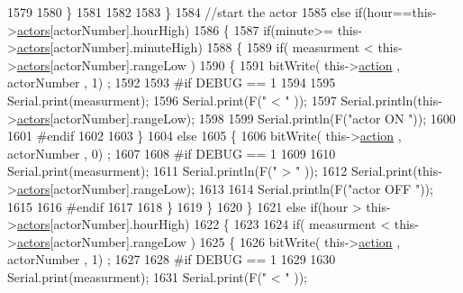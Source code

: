\begin{DoxyCode}
1579             
1580         \}
1581 
1582 
1583     \}
1584     \textcolor{comment}{//start the actor}
1585     \textcolor{keywordflow}{else} \textcolor{keywordflow}{if}(hour==this->\hyperlink{class_jetpack_a7e16d2f97837f9712a2e6de1c50d99db}{actors}[actorNumber].hourHigh)
1586     \{
1587         \textcolor{keywordflow}{if}(minute>= this->\hyperlink{class_jetpack_a7e16d2f97837f9712a2e6de1c50d99db}{actors}[actorNumber].minuteHigh)
1588         \{
1589             \textcolor{keywordflow}{if}( measurment < this->\hyperlink{class_jetpack_a7e16d2f97837f9712a2e6de1c50d99db}{actors}[actorNumber].rangeLow )
1590             \{
1591                 bitWrite( this->\hyperlink{class_jetpack_aca3142925a7b0834b34ae91d26af7765}{action} , actorNumber , 1) ;
1592 
1593 \textcolor{preprocessor}{            #if DEBUG == 1 }
1594 
1595                 Serial.print(measurment);
1596                 Serial.print(F(\textcolor{stringliteral}{" < "} ));
1597                 Serial.println(this->\hyperlink{class_jetpack_a7e16d2f97837f9712a2e6de1c50d99db}{actors}[actorNumber].rangeLow);
1598 
1599                 Serial.println(F(\textcolor{stringliteral}{"actor ON "}));
1600 
1601 \textcolor{preprocessor}{            #endif  }
1602 
1603             \}
1604             \textcolor{keywordflow}{else} 
1605             \{
1606                 bitWrite( this->\hyperlink{class_jetpack_aca3142925a7b0834b34ae91d26af7765}{action} , actorNumber , 0) ;
1607 
1608 \textcolor{preprocessor}{            #if DEBUG == 1 }
1609 
1610                 Serial.print(measurment);
1611                 Serial.println(F(\textcolor{stringliteral}{" > "} ));
1612                 Serial.print(this->\hyperlink{class_jetpack_a7e16d2f97837f9712a2e6de1c50d99db}{actors}[actorNumber].rangeLow);
1613 
1614                 Serial.println(F(\textcolor{stringliteral}{"actor OFF "}));
1615 
1616 \textcolor{preprocessor}{            #endif  }
1617                 
1618             \}
1619         \}
1620     \}
1621     \textcolor{keywordflow}{else} \textcolor{keywordflow}{if}(hour > this->\hyperlink{class_jetpack_a7e16d2f97837f9712a2e6de1c50d99db}{actors}[actorNumber].hourHigh)
1622     \{
1623 
1624         \textcolor{keywordflow}{if}( measurment < this->\hyperlink{class_jetpack_a7e16d2f97837f9712a2e6de1c50d99db}{actors}[actorNumber].rangeLow )
1625         \{
1626             bitWrite( this->\hyperlink{class_jetpack_aca3142925a7b0834b34ae91d26af7765}{action} , actorNumber , 1) ;
1627 
1628 \textcolor{preprocessor}{        #if DEBUG == 1 }
1629 
1630             Serial.print(measurment);
1631             Serial.print(F(\textcolor{stringliteral}{" < "} ));

\end{DoxyCode}
